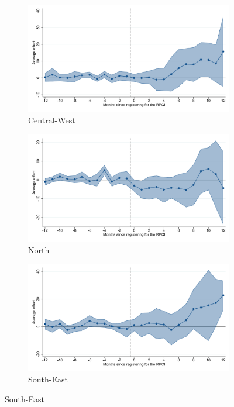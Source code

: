 \begin{figure}[H]
    \begin{subfigure}{0.32\textwidth}
    \caption{Central-West}
    \includegraphics[width=\textwidth]{04_Figures/muestra_10porciento/event_study_sal_formal_reg_centro_occ_dcdh_connected.pdf}
    \end{subfigure}
    \begin{subfigure}{0.32\textwidth}
    \caption{North}
    \includegraphics[width=\textwidth]{04_Figures/muestra_10porciento/event_study_sal_formal_reg_norte_dcdh_connected.pdf}
    \end{subfigure}
    \begin{subfigure}{0.32\textwidth}
    \caption{South-East}
    \includegraphics[width=\textwidth]{04_Figures/muestra_10porciento/event_study_sal_formal_reg_sur_dcdh_connected.pdf}
    \end{subfigure}


\end{figure}
